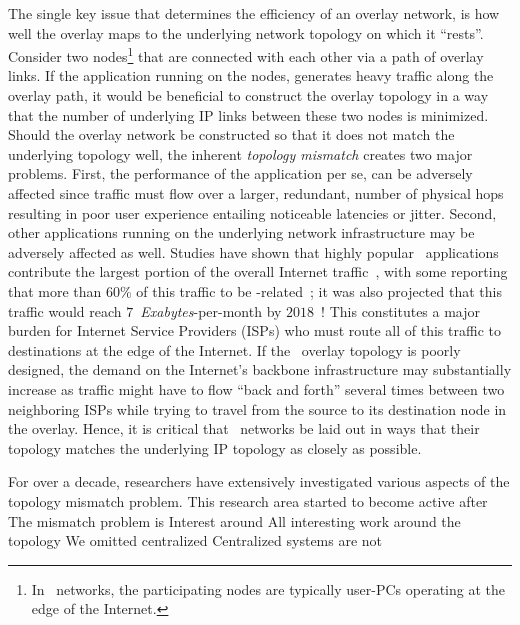 The single key issue that determines the efficiency of an overlay network,
is how well the overlay maps to the underlying network topology on which it
``rests''. 
Consider two nodes\footnote{In \p\ networks,
the participating nodes are typically user-PCs operating at the edge of the
Internet.} that are connected with each other via a path of overlay links.
If the application running on the nodes, generates heavy traffic along
the overlay path, it would be beneficial to
construct the overlay topology in a way that the number of 
underlying IP links between these two nodes is minimized.
Should the overlay network be constructed so that
it does not match the underlying topology well, 
the inherent \emph{topology mismatch} creates two
major problems. 
First, the performance of the application per se, can be
adversely affected since traffic must flow over a larger,
redundant, number of physical hops resulting in poor user experience 
entailing noticeable latencies or jitter. 
Second, other applications running
on the underlying network infrastructure may be adversely affected as well.
Studies have shown that highly popular \p\ applications contribute 
the largest portion of the overall 
Internet traffic~\cite{seroiu_analysiscds_2002,sen_analyzep2ptraffic_2004,krp_ispfear_2005}, with some reporting that more than $60$\% of this traffic 
to be \p-related~\cite{cachelogic,ipoque2009};
it was also projected that this traffic would reach
$7$~\emph{Exabytes}-per-month by $2018$~\cite{CVNI2014}! 
This constitutes a major burden for 
Internet Service Providers (ISPs) who must route 
all of this traffic to destinations at the edge of the Internet. 
If the \p\ overlay topology is poorly designed, 
the demand on the Internet's backbone infrastructure may 
substantially increase as traffic might have to flow
``back and forth'' several times between two neighboring ISPs
while trying to travel from the source to its destination node
in the overlay.
Hence, it is critical that \p\ networks be laid out 
in ways that their topology matches the underlying IP topology as 
closely as possible.

For over a decade, researchers have extensively investigated  
various aspects of the topology mismatch problem.
This research area started to become active after  The mismatch problem is Interest around All interesting work around the topology We omitted centralized Centralized systems are not 

